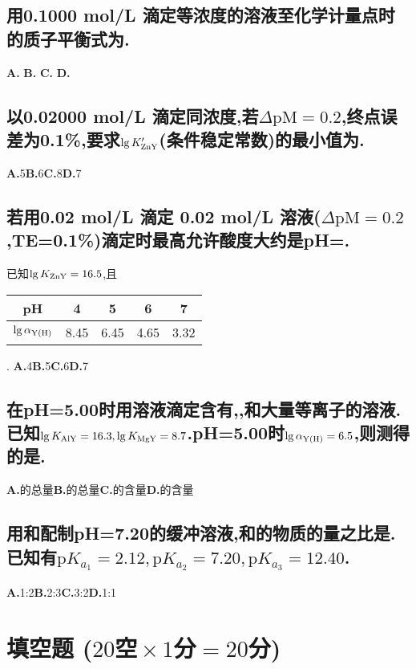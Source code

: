 \documentclass[UTF8]{article}
\newcommand{\p}{\mathrm{p}}
\newcommand{\M}{\mathrm{M}}
\newcommand{\shortline}{\underline{\hspace{1cm}}}
\newcommand{\bfA}{\textbf{A.}}
\newcommand{\bfB}{\qquad \textbf{B.}}
\newcommand{\bfC}{\qquad \textbf{C.}}
\newcommand{\bfD}{\qquad \textbf{D.}}
\newcommand{\indLarge}{\hspace{-0.6cm}}
\begin{document}
    \subsection{用0.1000 mol/L 滴定等浓度的溶液至化学计量点时的质子平衡式为\shortline.}
    \indLarge \bfA \ce{[H+] = [OH-] + [NH3]}
    \indLarge \bfB \ce{[NH4^+] + [H+] = [OH-]}
    \indLarge \bfC \ce{[H+] = [OH-] + [Cl-]}
    \indLarge \bfD \ce{[H+] + [NH4^+] = [OH-] + [Cl-]}

    \subsection{以0.02000 mol/L 滴定同浓度,若$\Delta \p\M=0.2$,终点误差为0.1\%,要求$\lg K'_{\ce{ZnY}}$(条件稳定常数)的最小值为\shortline.}
    \bfA 5\bfB 6\bfC 8\bfD 7

    \subsection{若用0.02 mol/L 滴定 0.02 mol/L 溶液($\Delta \p\M=0.2$,TE=0.1\%)滴定时最高允许酸度大约是pH=\shortline.}
        已知$\lg K_{\ce{ZnY}}=16.5$,且\begin{tabular}{c|cccc}
            pH&4&5&6&7\\\hline $\lg \alpha_{\ce{Y(H)}}$&8.45&6.45&4.65&3.32
        \end{tabular}.\qquad \qquad 
    \bfA 4\bfB 5\bfC 6\bfD 7

    \subsection{在pH=5.00时用溶液滴定含有,,和大量等离子的溶液.\\ 已知$\lg K_{\ce{AlY}}=16.3,\lg K_{\ce{MgY}}=8.7$.pH=5.00时$\lg \alpha_{\ce{Y(H)}}=6.5$,则测得的是\shortline.}
    \bfA {}的总量\bfB {}的总量\bfC {}的含量\bfD {}的含量

    \subsection{用和配制pH=7.20的缓冲溶液,和的物质的量之比是\shortline .\\ 已知有$\p K_{a_1}=2.12,\p K_{a_2}=7.20,\p K_{a_3}=12.40$.}
    \bfA 1:2\bfB 2:3\bfC 3:2\bfD 1:1

    \section{填空题 \small($20\!\!$空$\!\!\times 1\!\!$分$\!\!=\!\!20\!\!$分)}
\end{document}
